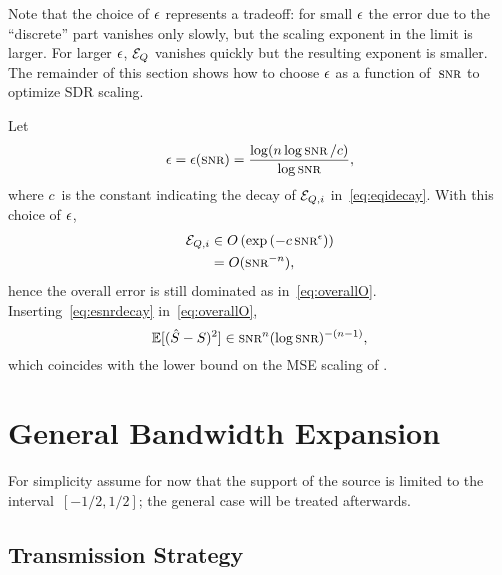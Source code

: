 Note that the choice of $\epsilon$ represents a tradeoff: for small $\epsilon$ the error due
to the ``discrete'' part vanishes only slowly, but the scaling exponent in the
limit is larger. For larger $\epsilon$, ${{\mathcal{E}}_Q}$ vanishes quickly but the resulting
exponent is smaller. The remainder of this section shows how to choose $\epsilon$ as a
function of~$\snr$ to optimize SDR scaling. 

Let
\begin{equation}
  \label{eq:esnrdecay}
  \e = \e(\snr) = \frac{\log(n \log\snr / c)}{\log\snr},
\end{equation}
where $c$~is the constant indicating the decay of ${{\mathcal{E}}_{Q,i}}$ in~\eqref{eq:eqidecay}.
With this choice of $\epsilon$,
\begin{align*}
  \Eqi &\in O\left( \exp\left( - c \snr^\e \right) \right) \\
 &= O(\snr^{-n}),
\end{align*}
hence the overall error is still dominated as in~\eqref{eq:overallO}.
Inserting~\eqref{eq:esnrdecay} in~\eqref{eq:overallO},
\begin{equation*}
  \mse \in \snr^n (\log\snr)^{-(n-1)},
\end{equation*}
which coincides with the lower bound on the MSE scaling of .





\section{General Bandwidth Expansion}\label{sec:genbwexp}

For simplicity assume for now that the support of the source is limited to
the interval~$[-1/2, 1/2]$; the general case will be treated afterwards.

\subsection{Transmission Strategy}

